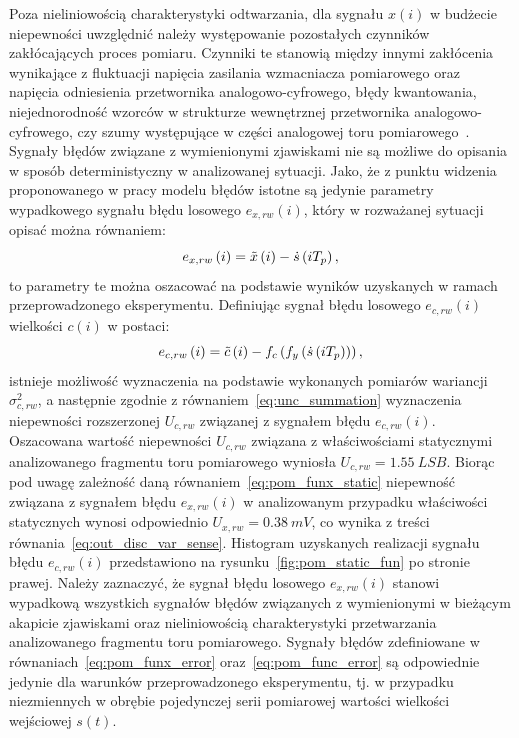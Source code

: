 Poza nieliniowością charakterystyki odtwarzania, dla sygnału $x(i)$ w budżecie niepewności uwzględnić należy występowanie pozostałych czynników zakłócających proces pomiaru. Czynniki te stanowią między innymi zakłócenia wynikające z fluktuacji napięcia zasilania wzmacniacza pomiarowego oraz napięcia odniesienia przetwornika analogowo-cyfrowego, błędy kwantowania, niejednorodność wzorców w strukturze wewnętrznej przetwornika analogowo-cyfrowego, czy szumy występujące w części analogowej toru pomiarowego~\cite{stm_adc}. Sygnały błędów związane z wymienionymi zjawiskami nie są możliwe do opisania w sposób deterministyczny w analizowanej sytuacji. Jako, że z punktu widzenia proponowanego w pracy modelu błędów istotne są jedynie parametry wypadkowego sygnału błędu losowego $e_{x,rw}(i)$, który w rozważanej sytuacji opisać można równaniem:
\begin{equation}
e_{x,rw} \left(i\right) = \tilde{x} \left(i\right) - \dot{s} \left(iT_{p}\right) \label{eq:pom_funx_error},
\end{equation}
to parametry te można oszacować na podstawie wyników uzyskanych w ramach przeprowadzonego eksperymentu. Definiując sygnał błędu losowego $e_{c,rw}(i)$ wielkości $c(i)$ w postaci:
\begin{equation}
e_{c,rw} \left(i\right) = \tilde{c} \left(i\right) - f_{c} \left(f_{y} \left(\dot{s} \left(iT_{p}\right)\right)\right) \label{eq:pom_func_error},
\end{equation}
istnieje możliwość wyznaczenia na podstawie wykonanych pomiarów wariancji $\sigma_{c,rw}^{2}$, a następnie zgodnie z równaniem~\eqref{eq:unc_summation} wyznaczenia niepewności rozszerzonej $U_{c,rw}$ związanej z sygnałem błędu $e_{c,rw}(i)$. Oszacowana wartość niepewności $U_{c,rw}$ związana z właściwościami statycznymi analizowanego fragmentu toru pomiarowego wyniosła $U_{c,rw} = \qty{1.55}{LSB}$. Biorąc pod uwagę zależność daną równaniem~\eqref{eq:pom_funx_static} niepewność związana z sygnałem błędu $e_{x,rw}(i)$ w analizowanym przypadku właściwości statycznych wynosi odpowiednio $U_{x,rw} = \qty{0.38}{mV}$, co wynika z treści równania~\eqref{eq:out_disc_var_sense}. Histogram uzyskanych realizacji sygnału błędu $e_{c,rw}(i)$ przedstawiono na rysunku~\ref{fig:pom_static_fun} po stronie prawej. Należy zaznaczyć, że sygnał błędu losowego $e_{x,rw}(i)$ stanowi wypadkową wszystkich sygnałów błędów związanych z wymienionymi w bieżącym akapicie zjawiskami oraz nieliniowością charakterystyki przetwarzania analizowanego fragmentu toru pomiarowego. Sygnały błędów zdefiniowane w równaniach~\eqref{eq:pom_funx_error} oraz~\eqref{eq:pom_func_error} są odpowiednie jedynie dla warunków przeprowadzonego eksperymentu, tj. w przypadku niezmiennych w obrębie pojedynczej serii pomiarowej wartości wielkości wejściowej $s(t)$.

